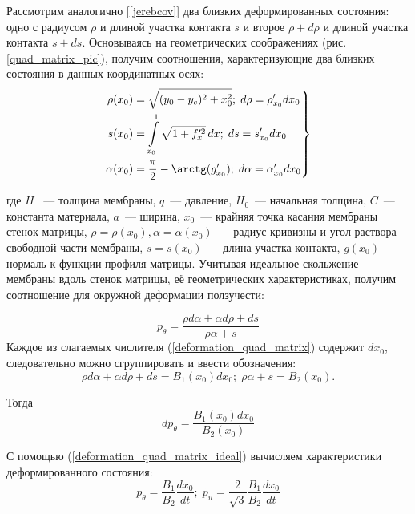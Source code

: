 Рассмотрим аналогично [\ref{jerebcov}] два близких деформированных состояния:
одно  с радиусом $\rho$ и длиной участка контакта $s$ и второе $\rho+d\rho$ и длиной участка контакта $s+ds$. Основываясь на геометрических соображениях (рис. \ref{quad_matrix_pic}), получим соотношения, характеризующие два близких состояния в данных координатных осях:
\begin{eqnarray}
\left. 
\begin{split}
\rho(x_0) &= \sqrt{(y_0-y_c)^2 + x_0^2};\; d\rho = \rho'_{x_0}dx_0\\
s(x_0) &= \int\limits^1_{x_0}\sqrt{1+f_x'^2}\,dx; \; ds = s'_{x_0}dx_0\\
\alpha(x_0)&= \dfrac{\pi}{2} - \arctg(g'_{x_0});\; d\alpha = \alpha'_{x_0}dx_0
\end{split}
\right\}
\end{eqnarray}

где $H$ ~--- толщина мембраны, $q$~--- давление, $H_0$~--- начальная толщина, $C$~---  константа материала, $a$~--- ширина, $x_0$~--- крайняя точка касания мембраны стенок матрицы, $\rho=\rho(x_0), \alpha=\alpha(x_0)$~--- радиус кривизны и угол раствора свободной части мембраны, $s=s(x_0)$~--- длина участка контакта,
$g(x_0)$~-- нормаль к функции профиля матрицы. 
Учитывая идеальное скольжение мембраны вдоль стенок матрицы, её геометрических характеристиках, получим соотношение для окружной деформации ползучести:

\begin{equation}
p_\theta = \dfrac{\rho d\alpha +\alpha d\rho+ds}{\rho\alpha+s}
\label{deformation_quad_matrix}
\end{equation}
Каждое из слагаемых числителя (\ref{deformation_quad_matrix}) содержит $dx_0$, следовательно можно сгруппировать и ввести обозначения: 
\begin{equation}
\rho d\alpha + \alpha d\rho +ds = B_1(x_0)dx_0;\; \rho\alpha+s = B_2(x_0).
\end{equation}

Тогда 
\begin{equation}
	dp_\theta = \dfrac{B_1(x_0)dx_0}{B_2(x_0)}
	\label{deformation_quad_matrix_ideal}
\end{equation}
 
 С помощью (\ref{deformation_quad_matrix_ideal}) вычисляем характеристики деформированного состояния:
 \begin{equation}
 \dot{p_\theta} = \dfrac{B_1}{B_2}\dfrac{dx_0}{dt};\;
 \dot{p_u}  = \dfrac{2}{\sqrt3} \dfrac{B_1}{B_2}\dfrac{dx_0}{dt}
 \end{equation}
 
